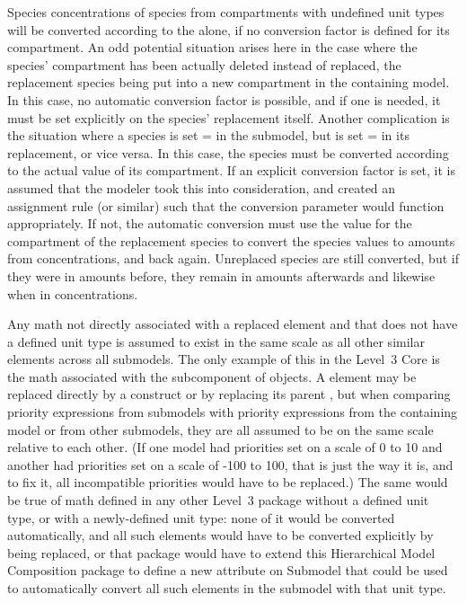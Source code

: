 Species concentrations of species from compartments with undefined unit
types will be converted according to the
 alone, if no conversion factor is
defined for its compartment.  An odd potential situation arises here in
the case where the species' compartment has been actually deleted
instead of replaced, the replacement species being put into a new
compartment in the containing model.  In this case, no automatic
conversion factor is possible, and if one is needed, it must be set
explicitly on the species' replacement itself.  Another complication is
the situation where a species is set
= in the submodel, but is set
= in its replacement, or vice
versa.  In this case, the species must be converted according to the
actual value of its compartment.  If an explicit conversion factor is
set, it is assumed that the modeler took this into consideration, and
created an assignment rule (or similar) such that the conversion
parameter would function appropriately.  If not, the automatic
conversion must use the value for the compartment of the replacement
species to convert the species values to amounts from concentrations,
and back again.  Unreplaced species are still converted, but if they
were in amounts before, they remain in amounts afterwards and likewise
when in concentrations.

Any math not directly associated with a replaced element and that does
not have a defined unit type is assumed to exist in the same scale as
all other similar elements across all submodels.  The only example of
this in the Level~3 Core is the math associated with the \Priority
subcomponent of \Event objects.  A \Priority element may be replaced
directly by a \ReplacedElement construct or by replacing its parent
\Event, but when comparing priority expressions from submodels with
priority expressions from the containing model or from other submodels,
they are all assumed to be on the same scale relative to each other.
(If one model had priorities set on a scale of 0 to 10 and another had
priorities set on a scale of -100 to 100, that is just the way it is,
and to fix it, all incompatible priorities would have to be replaced.)
The same would be true of math defined in any other Level~3 package
without a defined unit type, or with a newly-defined unit type: none of
it would be converted automatically, and all such elements would have to
be converted explicitly by being replaced, or that package would have to
extend this Hierarchical Model Composition package to define a new
attribute on Submodel that could be used to automatically convert all
such elements in the submodel with that unit type.

